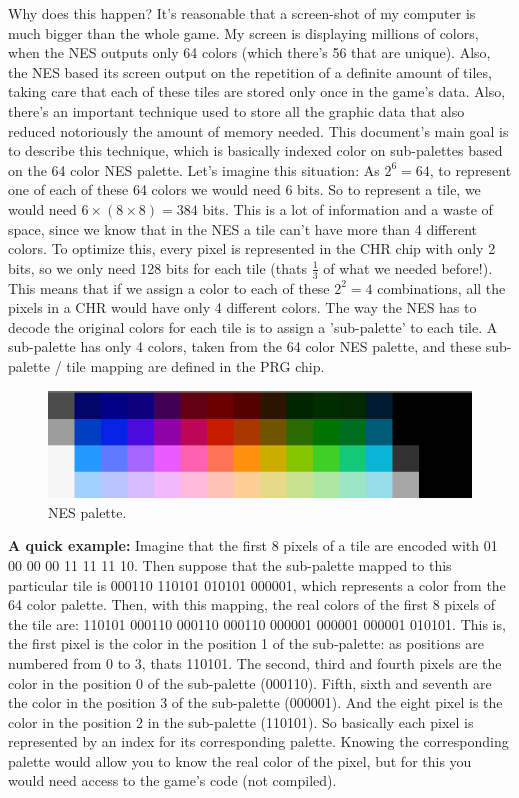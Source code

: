 \documentclass{article}
\begin{document}
\vskip 0.2in

Why does this happen? It's reasonable that a screen-shot of my computer is much bigger than the whole game. My screen is displaying millions of colors, when the NES outputs only 64 colors (which there's 56 that are unique). Also, the NES based its screen output on the repetition of a definite amount of tiles, taking care that each of these tiles are stored only once in the game's data. Also, there's an important technique used to store all the graphic data that also reduced notoriously the amount of memory needed. This document's main goal is to describe this technique, which is basically indexed color on sub-palettes based on the 64 color NES palette. Let's imagine this situation: As $2^6 = 64$, to represent one of each of these 64 colors we would need 6 bits. So to represent a tile, we would need $6 \times ( 8 \times 8 ) = 384$ bits. This is a lot of information and a waste of space, since we know that in the NES a tile can't have more than 4 different colors. To optimize this, every pixel is represented in the CHR chip with only 2 bits, so we only need 128 bits for each tile (thats $\frac{1}{3}$ of what we needed before!). This means that if we assign a color to each of these $2^2 = 4$ combinations, all the pixels in a CHR would have only 4 different colors. The way the NES has to decode the original colors for each tile is to assign a 'sub-palette' to each tile. A sub-palette has only 4 colors, taken from the 64 color NES palette, and these sub-palette / tile mapping are defined in the PRG chip.
\vskip 0.2in

\newpage

\begin{figure}[h]
\centering
\includegraphics[scale=0.5]{nespalette}
\caption{NES palette.}
\end{figure}


\textbf{A quick example:}
Imagine that the first 8 pixels of a tile are encoded with 01 00 00 00 11 11 11 10. Then suppose that the sub-palette mapped to this particular tile is 000110 110101 010101 000001, which represents a color from the 64 color palette. Then, with this mapping, the real colors of the first 8 pixels of the tile are: 110101 000110 000110 000110 000001 000001 000001 010101. This is, the first pixel is the color in the position 1 of the sub-palette: as positions are numbered from 0 to 3, thats 110101. The second, third and fourth pixels are the color in the position 0 of the sub-palette (000110). Fifth, sixth and seventh are the color in the position 3 of the sub-palette (000001). And the eight pixel is the color in the position 2 in the sub-palette (110101).
\vskip 0.2in
So basically each pixel is represented by an index for its corresponding palette. Knowing the corresponding palette would allow you to know the real color of the pixel, but for this you would need access to the game's code (not compiled).
\end{document}
